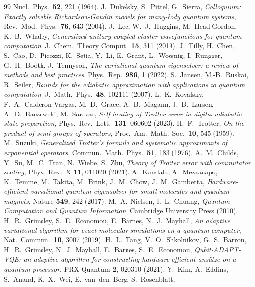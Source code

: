 \documentclass[
  aps,            %
  prc,            %
  reprint,        %
  superscriptaddress,
  floatfix,
  nofootinbib
]{revtex4-2}
\begin{document}
\begin{thebibliography}{99}
Nucl.\ Phys.\ \textbf{52}, 221 (1964).
J.~Dukelsky, S.~Pittel, G.~Sierra,
\textit{Colloquium: Exactly solvable Richardson-Gaudin models for many-body
quantum systems},
Rev.\ Mod.\ Phys.\ \textbf{76}, 643 (2004).
J.~Lee, W.~J.~Huggins, M.~Head-Gordon, K.~B.~Whaley,
\textit{Generalized unitary coupled cluster wavefunctions for quantum computation},
J.\ Chem.\ Theory Comput.\ \textbf{15}, 311 (2019).
J.~Tilly, H.~Chen, S.~Cao, D.~Picozzi, K.~Setia, Y.~Li, E.~Grant, L.~Wossnig,
I.~Rungger, G.~H.~Booth, J.~Tennyson,
\textit{The variational quantum eigensolver: a review of methods and best
practices},
Phys.\ Rep.\ \textbf{986}, 1 (2022).
S.~Jansen, M.-B.~Ruskai, R.~Seiler,
\textit{Bounds for the adiabatic approximation with applications to quantum
computation},
J.\ Math.\ Phys.\ \textbf{48}, 102111 (2007).
L.~K.~Kovalsky, F.~A.~Calderon-Vargas, M.~D.~Grace, A.~B.~Magann,
J.~B.~Larsen, A.~D.~Baczewski, M.~Sarovar,
\textit{Self-healing of Trotter error in digital adiabatic state preparation},
Phys.\ Rev.\ Lett.\ \textbf{131}, 060602 (2023).
H.~F.~Trotter,
\textit{On the product of semi-groups of operators},
Proc.\ Am.\ Math.\ Soc.\ \textbf{10}, 545 (1959).
M.~Suzuki,
\textit{Generalized Trotter's formula and systematic approximants of exponential
operators},
Commun.\ Math.\ Phys.\ \textbf{51}, 183 (1976).
A.~M.~Childs, Y.~Su, M.~C.~Tran, N.~Wiebe, S.~Zhu,
\textit{Theory of Trotter error with commutator scaling},
Phys.\ Rev.\ X \textbf{11}, 011020 (2021).
A.~Kandala, A.~Mezzacapo, K.~Temme, M.~Takita, M.~Brink, J.~M.~Chow,
J.~M.~Gambetta,
\textit{Hardware-efficient variational quantum eigensolver for small molecules
and quantum magnets},
Nature \textbf{549}, 242 (2017).
M.~A.~Nielsen, I.~L.~Chuang,
\textit{Quantum Computation and Quantum Information},
Cambridge University Press (2010).
H.~R.~Grimsley, S.~E.~Economou, E.~Barnes, N.~J.~Mayhall,
\textit{An adaptive variational algorithm for exact molecular simulations on a
quantum computer},
Nat.\ Commun.\ \textbf{10}, 3007 (2019).
H.~L.~Tang, V.~O.~Shkolnikov, G.~S.~Barron, H.~R.~Grimsley, N.~J.~Mayhall,
E.~Barnes, S.~E.~Economou,
\textit{Qubit-ADAPT-VQE: an adaptive algorithm for constructing
hardware-efficient ans\"atze on a quantum processor},
PRX Quantum \textbf{2}, 020310 (2021).
Y.~Kim, A.~Eddins, S.~Anand, K.~X.~Wei, E.~van~den~Berg, S.~Rosenblatt,

\end{thebibliography}
\end{document}
